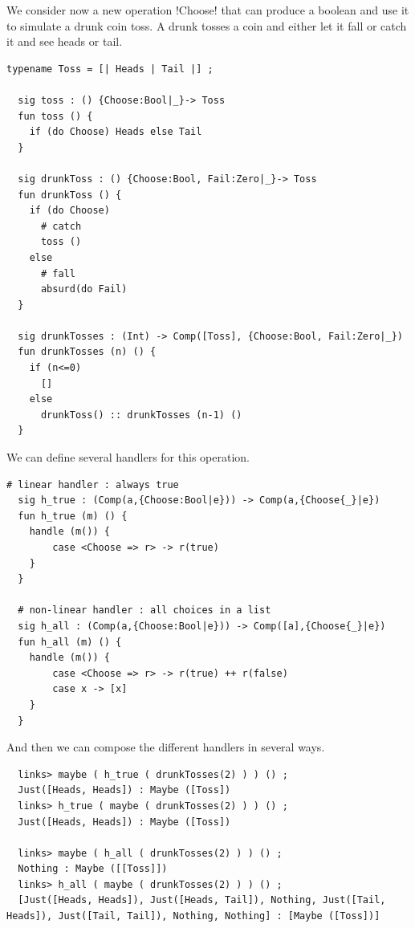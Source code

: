 \documentclass[11pt, nonacm=true, language=french, language=english]{acmart}
\begin{document}
\begin{ex}

We consider now a new operation !Choose! that can produce a boolean and use it to simulate a drunk coin toss. A drunk tosses a coin and either let it fall or catch it and see heads or tail.

\begin{lstlisting}[caption=Drunk toss]
  typename Toss = [| Heads | Tail |] ;

  sig toss : () {Choose:Bool|_}-> Toss
  fun toss () {
    if (do Choose) Heads else Tail
  }

  sig drunkToss : () {Choose:Bool, Fail:Zero|_}-> Toss
  fun drunkToss () {
    if (do Choose)
      # catch
      toss ()
    else
      # fall
      absurd(do Fail)
  }

  sig drunkTosses : (Int) -> Comp([Toss], {Choose:Bool, Fail:Zero|_})
  fun drunkTosses (n) () {
    if (n<=0)
      []
    else
      drunkToss() :: drunkTosses (n-1) ()
  }
\end{lstlisting}

We can define several handlers for this operation.

\begin{lstlisting}[caption=Toss handlers]
  # linear handler : always true
  sig h_true : (Comp(a,{Choose:Bool|e})) -> Comp(a,{Choose{_}|e})
  fun h_true (m) () {
    handle (m()) {
        case <Choose => r> -> r(true)
    }
  }

  # non-linear handler : all choices in a list
  sig h_all : (Comp(a,{Choose:Bool|e})) -> Comp([a],{Choose{_}|e})
  fun h_all (m) () {
    handle (m()) {
        case <Choose => r> -> r(true) ++ r(false)
        case x -> [x]
    }
  }
\end{lstlisting}

And then we can compose the different handlers in several ways.

\begin{lstlisting}
  links> maybe ( h_true ( drunkTosses(2) ) ) () ;
  Just([Heads, Heads]) : Maybe ([Toss])
  links> h_true ( maybe ( drunkTosses(2) ) ) () ;
  Just([Heads, Heads]) : Maybe ([Toss])

  links> maybe ( h_all ( drunkTosses(2) ) ) () ;
  Nothing : Maybe ([[Toss]])
  links> h_all ( maybe ( drunkTosses(2) ) ) () ;
  [Just([Heads, Heads]), Just([Heads, Tail]), Nothing, Just([Tail, Heads]), Just([Tail, Tail]), Nothing, Nothing] : [Maybe ([Toss])]
\end{lstlisting}


\end{ex}
\end{document}
